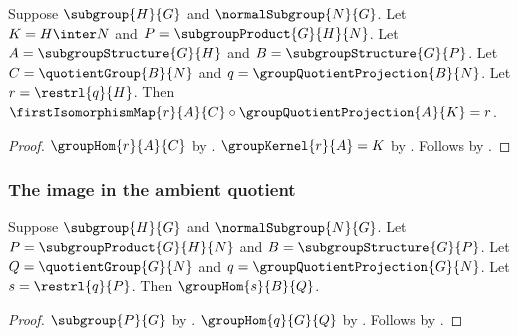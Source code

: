 \begin{theorem}\label{group_second_isomorphism_factorization}
    Suppose $\subgroup{H}{G}$ and $\normalSubgroup{N}{G}$.
    Let $K=H\inter N$ and $P=\subgroupProduct{G}{H}{N}$.
    Let $A=\subgroupStructure{G}{H}$ and
        $B=\subgroupStructure{G}{P}$.
    Let $C=\quotientGroup{B}{N}$ and
        $q=\groupQuotientProjection{B}{N}$.
    Let $r=\restrl{q}{H}$.
    Then
        $\firstIsomorphismMap{r}{A}{C}\circ
            \groupQuotientProjection{A}{K}=r$.
\end{theorem}
\begin{proof}
    $\groupHom{r}{A}{C}$ by
        .
    $\groupKernel{r}{A}=K$ by
        .
    Follows by .
\end{proof}

\subsubsection{The image in the ambient quotient}

\begin{theorem}\label{group_second_isomorphism_ambient_restriction_hom}
    Suppose $\subgroup{H}{G}$ and $\normalSubgroup{N}{G}$.
    Let $P=\subgroupProduct{G}{H}{N}$ and
        $B=\subgroupStructure{G}{P}$.
    Let $Q=\quotientGroup{G}{N}$ and
        $q=\groupQuotientProjection{G}{N}$.
    Let $s=\restrl{q}{P}$.
    Then $\groupHom{s}{B}{Q}$.
\end{theorem}
\begin{proof}
    $\subgroup{P}{G}$ by .
    $\groupHom{q}{G}{Q}$ by
        .
    Follows by .
\end{proof}

